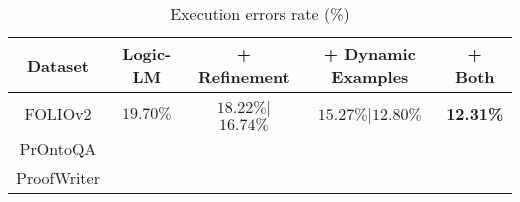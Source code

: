 \documentclass[conference]{IEEEtran}
\begin{document}
\begin{table*}[t]
    \centering
    \begin{tabular}{|c|c|c|c|c|}
    \hline
    \textbf{Dataset}                    & \textbf{Logic-LM}     & \textbf{+ Refinement}         & \textbf{+ Dynamic Examples}       & \textbf{+ Both}                \\ \hline
    FOLIOv2                             &  $19.70\%$            &     $18.22\%$|$16.74\%$       &      $15.27\%$|$12.80\%$          &     \textbf{12.31\%}           \\ \hline
    PrOntoQA                            &                       &                               &                                   &                                \\ \hline
    ProofWriter                         &                       &                               &                                   &                                \\ \hline
    \end{tabular}
\caption{Execution errors rate (\%)}    
\end{table*}




\end{document}
